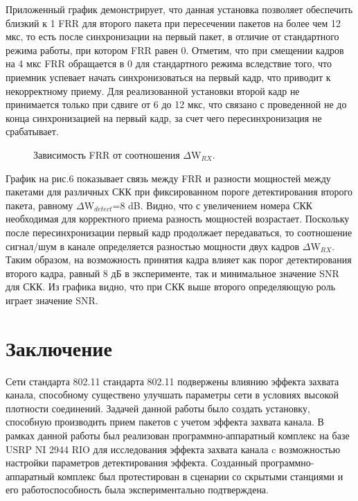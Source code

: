 \documentclass{llncs}
\begin{document}
Приложенный график демонстрирует, что данная установка позволяет обеспечить близкий к 1 FRR для второго пакета при пересечении пакетов на более чем 12 мкс, то есть после синхронизации на первый пакет, в отличие от стандартного режима работы, при котором FRR равен 0. Отметим, что при  смещении кадров на 4 мкс FRR обращается в 0 для стандартного режима вследствие того, что приемник успевает начать синхронизоваться на первый кадр, что приводит к некорректному приему. Для реализованной установки второй кадр не принимается только при сдвиге от 6 до 12 мкс, что связано с проведенной не до конца синхронизацией на первый кадр, за счет чего пересинхронизация не срабатывает.%
\\
\begin{figure}[htp!]
\caption{Зависимость FRR от соотношения $\Delta$W$_{RX}.$}
\label{ris:image}
\end{figure}
График на рис.6 показывает связь между FRR и разности мощностей между пакетами для различных СКК при фиксированном пороге детектирования второго пакета, равному $\Delta$W$_{detect}$=8 dB. Видно, что с  увеличением номера СКК необходимая для корректного приема разность мощностей возрастает. Поскольку после пересинхронизации первый кадр продолжает передаваться, то соотношение сигнал/шум в канале определяется разностью мощности двух кадров $\Delta$W$_{RX}$. Таким образом, на возможность принятия кадра влияет как порог детектирования второго кадра, равный 8 дБ в эксперименте, так и минимальное значение SNR для СКК. Из графика видно, что при СКК выше второго определяющую роль играет значение SNR.
\section{Заключение}
Сети стандарта 802.11 стандарта 802.11 подвержены влиянию эффекта захвата канала, способному существено улучшать параметры сети в условиях высокой плотности соединений.
Задачей данной работы было создать установку, способную производить прием пакетов  с учетом эффекта захвата канала.
В рамках данной работы был реализован программно-аппаратный комплекс на базе USRP NI 2944 RIO для исследования эффекта захвата канала c возможностью настройки параметров  детектирования эффекта. Созданный программно-аппаратный комплекс был протестирован в сценарии со скрытыми станциями и его работоспособность была экспериментально подтверждена. 
 
\end{document}
